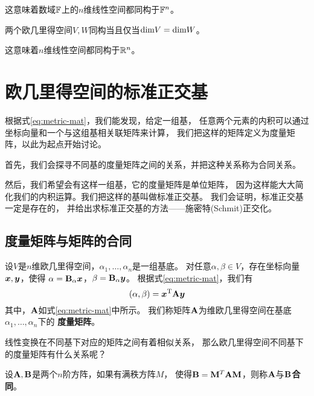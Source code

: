 \begin{remark}
  这意味着数域$\mathbb{F}$上的$n$维线性空间都同构于$\mathbb{F}^n$。
\end{remark}

\begin{theorem}[欧几里得空间同构的充要条件]
  两个欧几里得空间$V,W$同构当且仅当$\textrm{dim} V = \textrm{dim} W$。
\end{theorem}

\begin{remark}
  这意味着$n$维线性空间都同构于$\mathbb{R}^n$。
\end{remark}

\section{欧几里得空间的标准正交基}
根据式\eqref{eq:metric-mat}，我们能发现，给定一组基，
任意两个元素的内积可以通过坐标向量和一个与这组基相关联矩阵来计算，
我们把这样的矩阵定义为度量矩阵，以此为起点开始讨论。

首先，我们会探寻不同基的度量矩阵之间的关系，并把这种关系称为合同关系。

然后，我们希望会有这样一组基，它的度量矩阵是单位矩阵，
因为这样能大大简化我们的内积运算。我们把这样的基叫做标准正交基。
我们会证明，标准正交基一定是存在的，
并给出求标准正交基的方法——施密特(Schmit)正交化。

\subsection{度量矩阵与矩阵的合同}
\begin{definition}[度量矩阵]
  设$V$是$n$维欧几里得空间，$\alpha_1,\dots,\alpha_n$是一组基底。
  对任意$\alpha,\beta\in V$，存在坐标向量$\bm{x},\bm{y}$，使得
  $\alpha=\mathbf{B}_{\alpha}\bm{x}$，$\beta=\mathbf{B}_{\alpha}\bm{y}$。
  根据式\eqref{eq:metric-mat}，我们有
  \begin{displaymath}
    (\alpha,\beta) = \bm{x}^{\textrm{T}}\mathbf{A}\bm{y}
  \end{displaymath}
  其中，$\mathbf{A}$如式\eqref{eq:metric-mat}中所示。
  我们称矩阵$\mathbf{A}$为维欧几里得空间在基底$\alpha_1,\dots,\alpha_n$下的
  \textbf{度量矩阵}。
\end{definition}

线性变换在不同基下对应的矩阵之间有着相似关系，
那么欧几里得空间不同基下的度量矩阵有什么关系呢？

\begin{definition}[矩阵的合同]
  设$\mathbf{A},\mathbf{B}$是两个$n$阶方阵，如果有满秩方阵$M$，
  使得$\mathbf{B}=\mathbf{M}^T\mathbf{A}\mathbf{M}$，则称$\mathbf{A}$与$\mathbf{B}$\textbf{合同}。
\end{definition}

